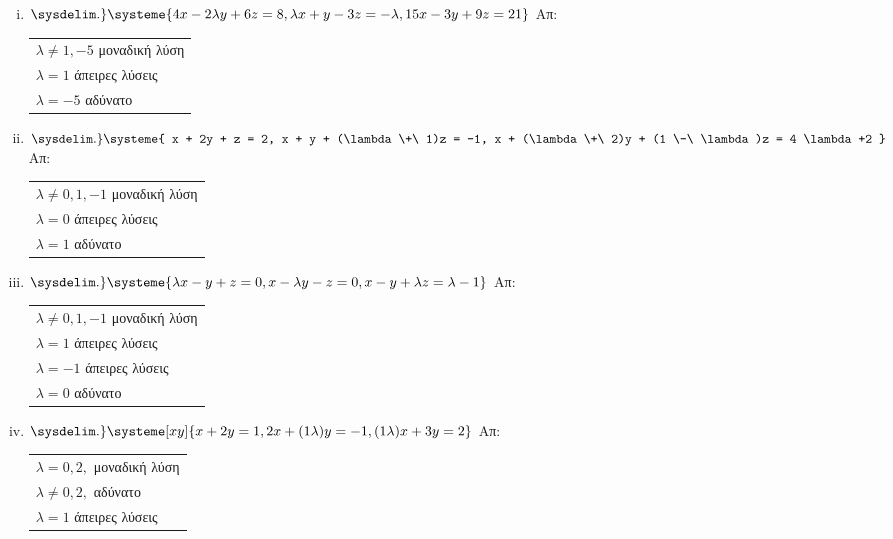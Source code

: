 \begin{enumerate}
	\begin{enumerate}[i)]
		\setlength{\itemsep}{\baselineskip}
\item $\sysdelim.\} \systeme{4x-2\lambda y + 6z = 8, \lambda x + y -3z = -\lambda, 15x -3y + 9z = 21}$ \hfill Απ: \begin{tabular}{l}
		$\lambda \neq 1,-5 $ μοναδική λύση \\
		$\lambda = 1 $ άπειρες λύσεις \\
		$\lambda =-5 $ αδύνατο
	\end{tabular}


\item $ \sysdelim.\} \systeme{
x + 2y + z = 2, 
x + y + (\lambda  \+\ 1)z = -1, 
x + (\lambda  \+\ 2)y + (1 \-\ \lambda)z = 4 \lambda +2
} $ \hfill Απ: \begin{tabular}{l}
	$ \lambda \neq 0, 1, -1 $ μοναδική λύση \\
	$ \lambda = 0 $ άπειρες λύσεις \\
	$ \lambda = 1 $ αδύνατο 
\end{tabular} 

\item $ \sysdelim.\} \systeme{
\lambda x - y + z = 0,
x - \lambda y - z = 0, 
x - y + \lambda z = \lambda - 1
} $ \hfill Απ: \begin{tabular}{l}
	$ \lambda \neq 0, 1, -1 $ μοναδική λύση \\
	$ \lambda = 1$ άπειρες λύσεις \\
	$ \lambda = -1 $ άπειρες λύσεις \\
	$ \lambda = 0 $ αδύνατο
\end{tabular} 

\item $ \sysdelim.\} \systeme[xy]{
x + 2y = 1,
2x+(1 \- \lambda)y = -1, 
(1 \- \lambda)x + 3y = 2
} $ \hfill Απ: \begin{tabular}{l}
	$ \lambda = 0, 2, $ μοναδική λύση \\
	$ \lambda \neq 0, 2, $ αδύνατο \\
	$ \lambda = 1$ άπειρες λύσεις \\
\end{tabular} 

  

	\end{enumerate}

\end{enumerate}


